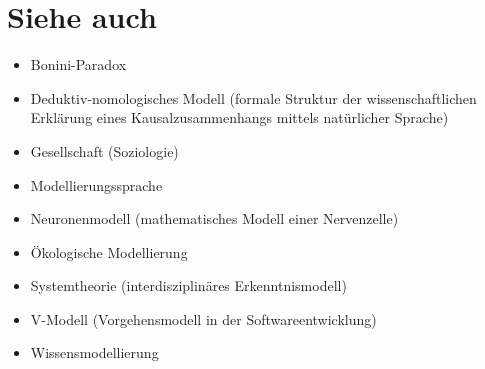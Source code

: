 \documentclass[a4paper, 12pt]{scrartcl}
\begin{document}
\section{Siehe auch}

\begin{itemize}
    \item Bonini-Paradox
    \item Deduktiv-nomologisches Modell (formale Struktur der wissenschaftlichen Erklärung eines Kausalzusammenhangs mittels natürlicher Sprache)
    \item Gesellschaft (Soziologie)
    \item Modellierungssprache
    \item Neuronenmodell (mathematisches Modell einer Nervenzelle)
    \item Ökologische Modellierung
    \item Systemtheorie (interdisziplinäres Erkenntnismodell)
    \item V-Modell (Vorgehensmodell in der Softwareentwicklung)
    \item Wissensmodellierung
\end{itemize}
\end{document}
